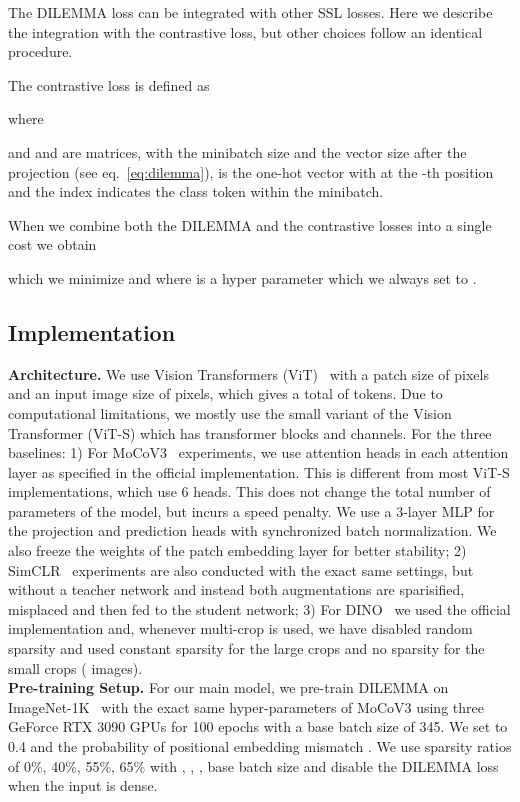 \documentclass[letterpaper]{article} \usepackage{aaai23}  \usepackage{times}  \usepackage{helvet}  \usepackage{courier}  \usepackage[hyphens]{url}  \usepackage{graphicx} \urlstyle{rm} \def\UrlFont{\rm}  \usepackage{natbib}  \usepackage{caption} \frenchspacing  \setlength{\pdfpagewidth}{8.5in}  \setlength{\pdfpageheight}{11in}  \usepackage{algorithm}
\newcommand{\methodname}{DILEMMA}
\begin{document}
The {\methodname} loss can be integrated with other SSL losses. Here we describe the integration with the contrastive loss, but other choices follow an identical procedure.

The contrastive loss is defined as

where

and  and  are  matrices, with  the minibatch size and  the vector size after the projection  (see eq.~\eqref{eq:dilemma}),  is the one-hot vector with  at the -th position and the index  indicates the class token within the minibatch.

When we combine both the {\methodname} and the contrastive losses into a single cost we obtain

which we minimize and where  is a hyper parameter which we always set to  .

\subsection{Implementation}
\noindent\textbf{Architecture.} We use Vision Transformers (ViT)~\cite{dosovitskiy2020image} with a patch size of  pixels and an input image size of  pixels, which gives a total of  tokens. Due to computational limitations, we mostly use the small variant of the Vision Transformer (ViT-S) which has  transformer blocks and  channels. For the three baselines: 1) For MoCoV3~\cite{chen2021empirical} experiments, we use  attention heads in each attention layer as specified in the official implementation. This is different from most ViT-S implementations, which use 6 heads. This does not change the total number of parameters of the model, but incurs a speed penalty. We use a 3-layer MLP for the projection and prediction heads with synchronized batch normalization. We also freeze the weights of the patch embedding layer for better stability; 2) SimCLR~\cite{chen2020simple} experiments are also conducted with the exact same settings, but without a teacher network and instead both augmentations are sparisified, misplaced and then fed to the student network; 3) For DINO~\cite{caron2021emerging} we used the official implementation and, whenever multi-crop is used, we have disabled random sparsity and used constant sparsity for the large crops and no sparsity for the small crops ( images).\\

\noindent\textbf{Pre-training Setup.} For our main model, we pre-train {\methodname} on ImageNet-1K~\cite{deng2009imagenet} with the exact same hyper-parameters of MoCoV3 using three GeForce RTX 3090 GPUs for 100 epochs with a base batch size of 345. We set   to 0.4 and the probability of positional embedding mismatch . We use sparsity ratios of 0\%, 40\%, 55\%, 65\% with , , ,  base batch size and disable the {\methodname} loss when the input is dense.
\end{document}

